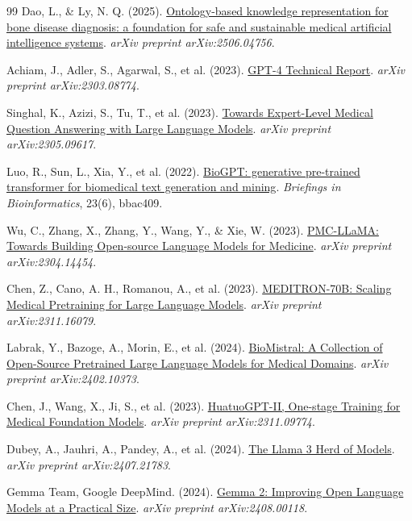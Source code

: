 \begin{thebibliography}{99}
Dao, L., \& Ly, N. Q. (2025).
\href{https://arxiv.org/abs/2506.04756}{Ontology-based knowledge representation for bone disease diagnosis: a foundation for safe and sustainable medical artificial intelligence systems}.
\textit{arXiv preprint arXiv:2506.04756}.

Achiam, J., Adler, S., Agarwal, S., et al. (2023).
\href{https://arxiv.org/abs/2303.08774}{GPT-4 Technical Report}.
\textit{arXiv preprint arXiv:2303.08774}.

Singhal, K., Azizi, S., Tu, T., et al. (2023).
\href{https://arxiv.org/abs/2305.09617}{Towards Expert-Level Medical Question Answering with Large Language Models}.
\textit{arXiv preprint arXiv:2305.09617}.

Luo, R., Sun, L., Xia, Y., et al. (2022).
\href{https://arxiv.org/abs/2210.10341}{BioGPT: generative pre-trained transformer for biomedical text generation and mining}.
\textit{Briefings in Bioinformatics}, 23(6), bbac409.

Wu, C., Zhang, X., Zhang, Y., Wang, Y., \& Xie, W. (2023).
\href{https://arxiv.org/abs/2304.14454}{PMC-LLaMA: Towards Building Open-source Language Models for Medicine}.
\textit{arXiv preprint arXiv:2304.14454}.

Chen, Z., Cano, A. H., Romanou, A., et al. (2023).
\href{https://arxiv.org/abs/2311.16079}{MEDITRON-70B: Scaling Medical Pretraining for Large Language Models}.
\textit{arXiv preprint arXiv:2311.16079}.

Labrak, Y., Bazoge, A., Morin, E., et al. (2024).
\href{https://arxiv.org/abs/2402.10373}{BioMistral: A Collection of Open-Source Pretrained Large Language Models for Medical Domains}.
\textit{arXiv preprint arXiv:2402.10373}.

Chen, J., Wang, X., Ji, S., et al. (2023).
\href{https://arxiv.org/abs/2311.09774}{HuatuoGPT-II, One-stage Training for Medical Foundation Models}.
\textit{arXiv preprint arXiv:2311.09774}.

Dubey, A., Jauhri, A., Pandey, A., et al. (2024).
\href{https://arxiv.org/abs/2407.21783}{The Llama 3 Herd of Models}.
\textit{arXiv preprint arXiv:2407.21783}.

Gemma Team, Google DeepMind. (2024).
\href{https://arxiv.org/abs/2408.00118}{Gemma 2: Improving Open Language Models at a Practical Size}.
\textit{arXiv preprint arXiv:2408.00118}.


\end{thebibliography}
